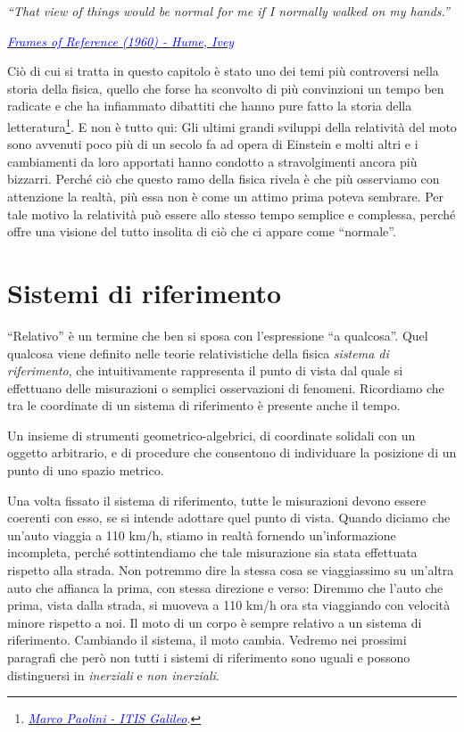\marginpar{\minitoc}

\epigraph{\emph{``That view of things would be normal for me if I normally walked on my hands.''}}{\href{https://youtu.be/bJMYoj4hHqU?feature=shared&t=17}{\textcolor{blue}{\textit{Frames of Reference (1960) - Hume, Ivey}}}}

Ciò di cui si tratta in questo capitolo
è stato uno dei temi più controversi nella storia della fisica, quello
che forse ha sconvolto di più convinzioni un tempo ben radicate e
che ha infiammato dibattiti che hanno pure fatto la storia della
letteratura\footnote{\href{https://youtu.be/0kxarmulkiA?feature=shared&t=6180}{\textcolor{blue}{\textit{Marco Paolini - ITIS Galileo}}}.}. E non è tutto qui: Gli ultimi grandi sviluppi della relatività
del moto sono avvenuti poco più di un secolo fa ad opera di Einstein
e molti altri e i cambiamenti da loro apportati hanno condotto a
stravolgimenti ancora più bizzarri. Perché ciò che questo ramo della
fisica rivela è che più osserviamo con attenzione la realtà, più essa non
è come un attimo prima poteva sembrare. Per tale motivo la relatività può
essere allo stesso tempo semplice e complessa, perché offre una visione
del tutto insolita di ciò che ci appare come ``normale''.


\section{Sistemi di riferimento}
``Relativo'' è un termine che ben si sposa con l'espressione ``a qualcosa''.
Quel qualcosa viene definito nelle teorie relativistiche della fisica
\textit{sistema di riferimento}, che intuitivamente rappresenta il punto di
vista dal quale si effettuano delle misurazioni o semplici osservazioni di
fenomeni. Ricordiamo che tra le coordinate di un sistema di riferimento
è presente anche il tempo.

\begin{tcolorbox}[colback = yellow!30, colframe = yellow!30!black, title = {Sistema di riferimento}]
    Un insieme di strumenti geometrico-algebrici, di coordinate solidali con un
    oggetto arbitrario, e di procedure che consentono di individuare la posizione
    di un punto di uno spazio metrico.
\end{tcolorbox}

Una volta fissato il sistema di riferimento, tutte le misurazioni devono
essere coerenti con esso, se si intende adottare quel punto di vista.
Quando diciamo che un'auto viaggia a 110 km/h, stiamo in realtà fornendo
un'informazione incompleta, perché sottintendiamo che tale misurazione
sia stata effettuata rispetto alla strada. Non potremmo dire la stessa
cosa se viaggiassimo su un'altra auto che affianca la prima, con stessa
direzione e verso: Diremmo che
l'auto che prima, vista dalla strada, si muoveva a 110 km/h ora sta viaggiando con velocità
minore rispetto a noi. Il moto di un corpo è sempre relativo a un sistema di riferimento.
Cambiando il sistema, il moto cambia. Vedremo nei prossimi paragrafi
che però non tutti i sistemi di riferimento sono uguali e possono
distinguersi in \textit{inerziali} e \textit{non inerziali}.

